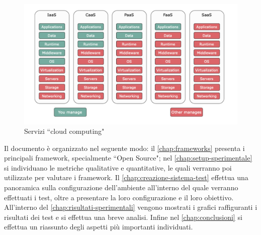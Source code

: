 \documentclass[12pt,a4paper,openany,twoside]{book}
\begin{document}
\begin{figure}[h]
    \centering
    \includegraphics[width=\linewidth]{figures/IaaS_PaaS_FaaS.pdf}
    \caption{Servizi ``cloud computing"}
    \label{fig:servizi-cloud-computing}
\end{figure}

\noindent
Il documento è organizzato nel seguente modo: il \cref{chap:frameworks} presenta i principali framework, specialmente ``Open Source"; nel \cref{chap:setup-sperimentale} si individuano le metriche qualitative e quantitative, le quali verranno poi utilizzate per valutare i framework. Il \cref{chap:creazione-sistema-test} effettua una panoramica sulla configurazione dell'ambiente all'interno del quale verranno effettuati i test, oltre a presentare la loro configurazione e il loro obiettivo. All'interno del \cref{chap:risultati-sperimentali} vengono mostrati i grafici raffiguranti i risultati dei test e si effettua una breve analisi. Infine nel \cref{chap:conclusioni} si effettua un riassunto degli aspetti più importanti individuati.



\end{document}
